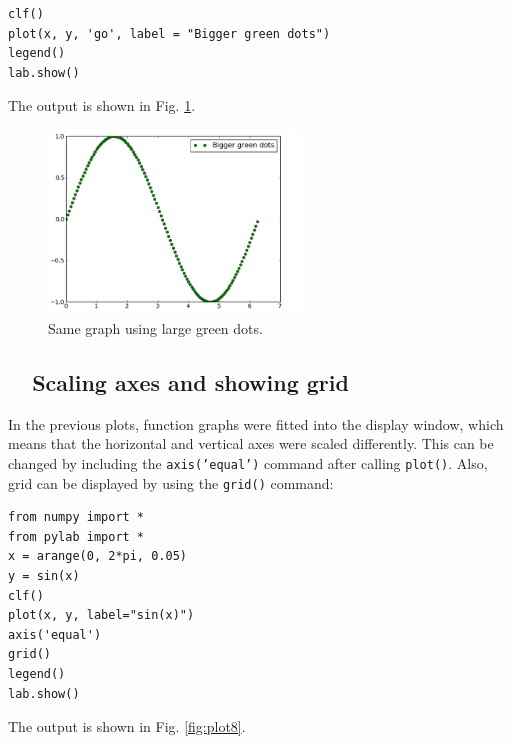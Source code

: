 \begin{verbatim}
clf()
plot(x, y, 'go', label = "Bigger green dots")
legend()
lab.show()
\end{verbatim}
\noindent
The output is shown in Fig. \ref{fig:plot5}.
\newpage

\begin{figure}[!ht]
\begin{center}
\includegraphics[width=0.6\textwidth]{imgp/plot5.png}
\end{center}
\vspace{-6mm}
\caption{Same graph using large green dots.}
\label{fig:plot5}
\end{figure}
\noindent

\subsection{\ \ Scaling axes and showing grid}

In the previous plots, function graphs were fitted into the 
display window, which means that the horizontal and vertical 
axes were scaled differently. This can be changed by including the 
{\tt axis('equal')} command after calling {\tt plot()}. Also, 
grid can be displayed by using the {\tt grid()} command:

\begin{verbatim}
from numpy import *
from pylab import *
x = arange(0, 2*pi, 0.05)
y = sin(x)
clf()
plot(x, y, label="sin(x)")
axis('equal')
grid()
legend()
lab.show()
\end{verbatim}
\noindent
The output is shown in Fig. \ref{fig:plot8}.
\newpage

